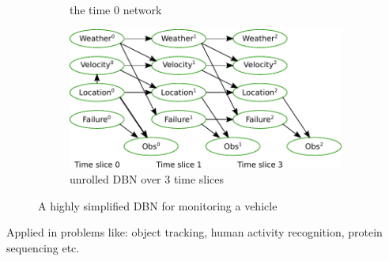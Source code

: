\begin{frame}[t]
\begin{figure}
\begin{subfigure}[b]{0.33\textwidth}
  			\caption{\tiny{the time 0 network}}
  			\label{fig:zeroDBN}
  		\end{subfigure}
  		\begin{subfigure}[b]{0.39\textwidth}
			\centering
			\includegraphics[width=\textwidth]{graphics/hmm-intro/dbn-vehicle/unrolled.pdf} 
  			\caption{\tiny{unrolled DBN over 3 time slices}}
  			\label{fig:unrolledDBN}
  		\end{subfigure}
  		\caption{\tiny{A highly simplified DBN for monitoring a vehicle \citep{KollerFriedman09}}}
  		\label{fig:DBN}
  	\end{figure}
  	
  	Applied in problems like: object tracking, human activity recognition, protein sequencing etc.
      \end{frame}


